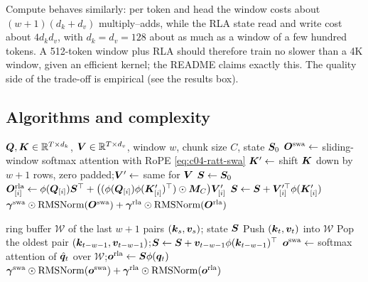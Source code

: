 Compute behaves similarly: per token and head the window costs about $(w+1)(d_k+d_v)$
multiply--adds, while the RLA state read and write cost about $4d_kd_v$, with $d_k=d_v=128$ about
as much as a window of a few hundred tokens. A 512-token window plus RLA should therefore train no
slower than a 4K window, given an efficient kernel; the README claims exactly this. The quality
side of the trade-off is empirical (see the results box).

\subsection{Algorithms and complexity}

\begin{algorithm}[t]
\caption{RATTENTION local layer, training or prefill (one head)}\label{alg:c04-ratt-prefill}
\begin{algorithmic}[1]
\Require $\bm{Q},\bm{K}\in\mathbb{R}^{T\times d_k}$, $\bm{V}\in\mathbb{R}^{T\times d_v}$, window $w$, chunk size $C$, state $\bm{S}_0$
\State $\bm{O}^{\mathrm{swa}}\gets$ sliding-window softmax attention with RoPE \eqref{eq:c04-ratt-swa} 
\State $\bm{K}'\gets$ shift $\bm{K}$ down by $w+1$ rows, zero padded;\quad $\bm{V}'\gets$ same for $\bm{V}$
\State $\bm{S}\gets\bm{S}_0$
  \State $\bm{O}^{\mathrm{rla}}_{[i]}\gets\phi(\bm{Q}_{[i]})\bm{S}^{\top}+\big((\phi(\bm{Q}_{[i]})\phi(\bm{K}'_{[i]})^{\top})\odot\bm{M}_C\big)\bm{V}'_{[i]}$
  \State $\bm{S}\gets\bm{S}+\bm{V}'^{\top}_{[i]}\phi(\bm{K}'_{[i]})$
\EndFor
\State \Return $\bm{\gamma}^{\mathrm{swa}}\odot\mathrm{RMSNorm}(\bm{O}^{\mathrm{swa}})+\bm{\gamma}^{\mathrm{rla}}\odot\mathrm{RMSNorm}(\bm{O}^{\mathrm{rla}})$ 
\end{algorithmic}
\end{algorithm}

\begin{algorithm}[t]
\caption{RATTENTION decoding step at time $t$ (one head)}\label{alg:c04-ratt-decode}
\begin{algorithmic}[1]
\Require ring buffer $\mathcal{W}$ of the last $w+1$ pairs $(\bm{k}_s,\bm{v}_s)$; state $\bm{S}$
\State Push $(\bm{k}_t,\bm{v}_t)$ into $\mathcal{W}$
  \State Pop the oldest pair $(\bm{k}_{t-w-1},\bm{v}_{t-w-1})$;\quad $\bm{S}\gets\bm{S}+\bm{v}_{t-w-1}\phi(\bm{k}_{t-w-1})^{\top}$ 
\EndIf
\State $\bm{o}^{\mathrm{swa}}\gets$ softmax attention of $\hat{\bm{q}}_t$ over $\mathcal{W}$;\quad $\bm{o}^{\mathrm{rla}}\gets\bm{S}\phi(\bm{q}_t)$
\State \Return $\bm{\gamma}^{\mathrm{swa}}\odot\mathrm{RMSNorm}(\bm{o}^{\mathrm{swa}})+\bm{\gamma}^{\mathrm{rla}}\odot\mathrm{RMSNorm}(\bm{o}^{\mathrm{rla}})$
\end{algorithmic}
\end{algorithm}

